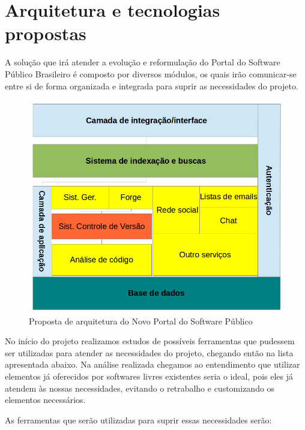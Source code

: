 \section{Arquitetura e tecnologias propostas}
\label{sec:arquitetura}

A solução que irá atender a evolução e reformulação do Portal do Software Público Brasileiro é composto por diversos módulos, os quais irão comunicar-se entre si de forma organizada e integrada para suprir as necessidades do projeto.
%

\begin{figure}[htpb]
  \begin{center}
    \includegraphics[width=.37\textwidth]{images/visao_arq.png}
  \end{center}
  \caption{Proposta de arquitetura do Novo Portal do Software Público}
  \label{fig:core_concurrent}
\end{figure}

No início do projeto realizamos estudos de possíveis ferramentas que pudessem ser utilizadas para atender as necessidades do projeto, chegando então na lista apresentada abaixo.
Na análise realizada chegamos ao entendimento que utilizar elementos já oferecidos por softwares livres existentes seria o ideal, pois eles já atendem às nossas necessidades, evitando o retrabalho e customizando os elementos necessários.   

As ferramentas que serão utilizadas para suprir essas necessidades serão:


